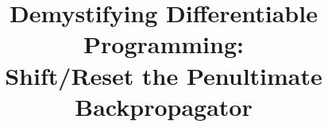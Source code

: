\documentclass[acmsmall,10pt,review,anonymous]{acmart}\settopmatter{printfolios=true,printccs=false,printacmref=false}
\begin{document}

\title[Demystifying Differentiable Programming: Shift/Reset the Penultimate Backpropagator]{Demystifying Differentiable Programming: \\Shift/Reset the Penultimate Backpropagator}







\end{document}
